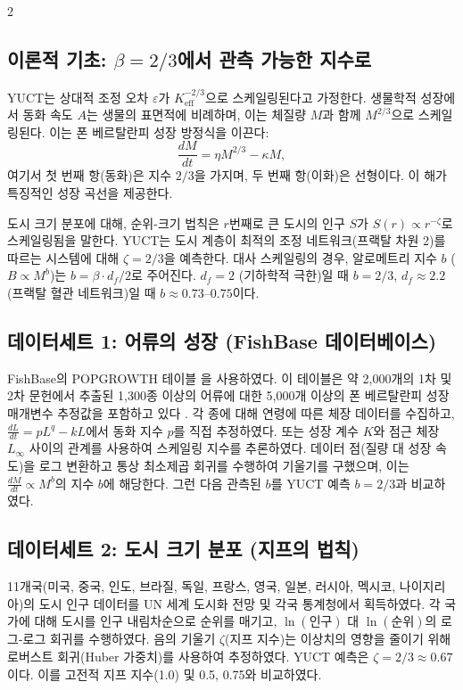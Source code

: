 \documentclass[11pt,a4paper]{article}
\newcommand{\eps}{\varepsilon}
\newcommand{\Keff}{K_{\mathrm{eff}}}
\newcommand{\betaf}{\beta}
\newcommand{\df}{d_f}
\begin{document}
\begin{multicols}{2}
		\subsection{이론적 기초: \(\beta = 2/3\)에서 관측 가능한 지수로}
		
		YUCT는 상대적 조정 오차 \(\eps\)가 \(\Keff^{-2/3}\)으로 스케일링된다고 가정한다. 생물학적 성장에서 동화 속도 \(A\)는 생물의 표면적에 비례하며, 이는 체질량 \(M\)과 함께 \(M^{2/3}\)으로 스케일링된다. 이는 폰 베르탈란피 성장 방정식을 이끈다:
		\[
		\frac{dM}{dt} = \eta M^{2/3} - \kappa M,
		\]
		여기서 첫 번째 항(동화)은 지수 \(2/3\)을 가지며, 두 번째 항(이화)은 선형이다. 이 해가 특징적인 성장 곡선을 제공한다.
		
		도시 크기 분포에 대해, 순위-크기 법칙은 \(r\)번째로 큰 도시의 인구 \(S\)가 \(S(r) \propto r^{-\zeta}\)로 스케일링됨을 말한다. YUCT는 도시 계층이 최적의 조정 네트워크(프랙탈 차원 2)를 따르는 시스템에 대해 \(\zeta = 2/3\)을 예측한다. 대사 스케일링의 경우, 알로메트리 지수 \(b\) (\(B \propto M^{b}\))는 \(b = \betaf \cdot \df / 2\)로 주어진다. \(\df = 2\) (기하학적 극한)일 때 \(b = 2/3\), \(\df \approx 2.2\) (프랙탈 혈관 네트워크)일 때 \(b \approx 0.73\)–\(0.75\)이다.
		
		\subsection{데이터세트 1: 어류의 성장 (FishBase 데이터베이스)}
		
		FishBase의 POPGROWTH 테이블 \cite{FishBase}을 사용하였다. 이 테이블은 약 2,000개의 1차 및 2차 문헌에서 추출된 1,300종 이상의 어류에 대한 5,000개 이상의 폰 베르탈란피 성장 매개변수 추정값을 포함하고 있다 \cite{Pauly1998}. 각 종에 대해 연령에 따른 체장 데이터를 수집하고, \(\frac{dL}{dt} = p L^{q} - k L\)에서 동화 지수 \(p\)를 직접 추정하였다. 또는 성장 계수 \(K\)와 점근 체장 \(L_\infty\) 사이의 관계를 사용하여 스케일링 지수를 추론하였다. 데이터 점(질량 대 성장 속도)을 로그 변환하고 통상 최소제곱 회귀를 수행하여 기울기를 구했으며, 이는 \(\frac{dM}{dt} \propto M^{b}\)의 지수 \(b\)에 해당한다. 그런 다음 관측된 \(b\)를 YUCT 예측 \(b = 2/3\)과 비교하였다.
		
		\subsection{데이터세트 2: 도시 크기 분포 (지프의 법칙)}
		
		11개국(미국, 중국, 인도, 브라질, 독일, 프랑스, 영국, 일본, 러시아, 멕시코, 나이지리아)의 도시 인구 데이터를 UN 세계 도시화 전망 \cite{UN2018} 및 각국 통계청에서 획득하였다. 각 국가에 대해 도시를 인구 내림차순으로 순위를 매기고, \(\ln(\text{인구})\) 대 \(\ln(\text{순위})\)의 로그-로그 회귀를 수행하였다. 음의 기울기 \(\zeta\)(지프 지수)는 이상치의 영향을 줄이기 위해 로버스트 회귀(Huber 가중치)를 사용하여 추정하였다. YUCT 예측은 \(\zeta = 2/3 \approx 0.67\)이다. 이를 고전적 지프 지수(1.0) 및 0.5, 0.75와 비교하였다.
		

\end{multicols}
\end{document}
